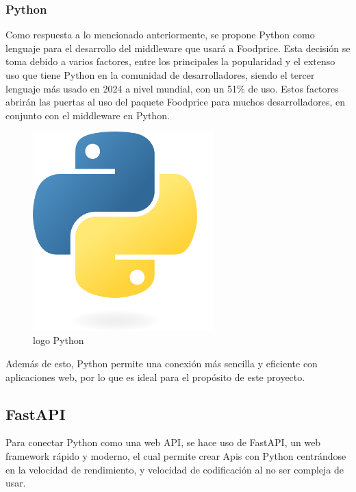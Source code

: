 \subsubsection{Python}
\noindent Como respuesta a lo mencionado anteriormente, se propone Python como lenguaje para el desarrollo del middleware que usar\'a a Foodprice. Esta decisi\'on se toma debido a varios factores, entre los principales la popularidad y el extenso uso que tiene Python en la comunidad de desarrolladores, siendo el tercer lenguaje m\'as usado en 2024 a nivel mundial, con un 51\% de uso\cite{MostUsedLanguages}. Estos factores abrir\'an las puertas al uso del paquete Foodprice para muchos desarrolladores, en conjunto con el middleware en Python.
\begin{figure}[H]
        \centering
        \includegraphics[width=7cm]{img/metodologia/Python-logo-notext.svg.png}
        \caption{logo Python}
        \label{fig:logoPython}
    \end{figure}

Adem\'as de esto, Python permite una conexi\'on m\'as sencilla y eficiente con aplicaciones web, por lo que es ideal para el prop\'osito de este proyecto.

\subsection{FastAPI}
Para conectar Python como una web API, se hace uso de FastAPI, un web framework r\'apido y moderno, el cual permite crear Apis con Python centr\'andose en la velocidad de rendimiento, y velocidad de codificaci\'on al no ser compleja de usar\cite{FastAPI}.

